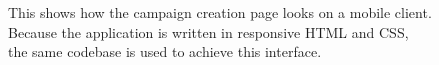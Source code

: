 \documentclass{article}
\begin{document}
		\begin{figure}[H]
			\centering
			\caption{This shows how the campaign creation page looks on a mobile client. Because the application is written in responsive HTML and CSS, the same codebase is used to achieve this interface.}
			\label{fig:eval-mobile-1}
		\end{figure}
\end{document}
